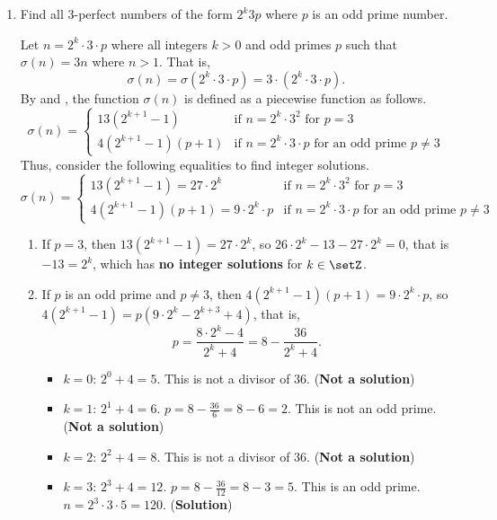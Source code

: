 \begin{enumerate}
\begin{enumerate}
    \newpage
    \item Find all $3$-perfect numbers of the form $2^k 3 p$ where $p$ is an odd prime number.
    \begin{subanswer}
      Let $n = 2^k \cdot 3 \cdot p$ where all integers $k>0$ and odd primes $p$ such that 
      $\sigma(n) = 3n$ where $n>1$. That is,
      \[
      \sigma(n) =\sigma(2^k \cdot 3 \cdot p) = 3 \cdot (2^k \cdot 3 \cdot p).
      \]
      By  and , the function \(\sigma(n)\) is defined as a
      piecewise function as follows.
      \[
        \sigma(n) =
        \begin{cases}
          13(2^{k+1}-1) & \text{if } n = 2^k \cdot 3^2 \text{ for } p = 3\\
          4(2^{k+1}-1)(p+1) & \text{if } n = 2^k \cdot 3 \cdot p \text{ for an odd prime } p \ne 3
        \end{cases}
      \]
      Thus, consider the following equalities to find integer solutions.
      \[
        \sigma(n) =
        \begin{cases}
          13(2^{k+1}-1) = 27 \cdot 2^k & \text{if } n = 2^k \cdot 3^2 \text{ for } p = 3\\
          4(2^{k+1}-1)(p+1) = 9 \cdot 2^k \cdot p & \text{if } n = 2^k \cdot 3 \cdot p \text{ for an odd prime } p \ne 3
        \end{cases}
      \]
      \begin{enumerate}
        \item If $p=3$, then $13(2^{k+1}-1) = 27 \cdot 2^k$, so $26\cdot 2^{k}-13 - 27 \cdot 2^k= 0$, 
        that is $-13 = 2^k$, which has \textbf{no integer solutions} for $k \in \setZ$.
        \item If $p$ is an odd prime and $p \neq 3$, then $4(2^{k+1}-1)(p+1) = 9 \cdot 2^k \cdot p$, 
        so $4(2^{k+1}-1) = p(9 \cdot 2^k - 2^{k+3}+4)$, that is, $$p=\frac{8 \cdot 2^k - 4}{2^k + 4}= 8 - \frac{36}{2^k+4}.$$
        \begin{itemize}
          \item $k=0$: $2^0+4=5$. This is not a divisor of 36. (\textbf{Not a solution})
          \item $k=1$: $2^1+4=6$. $p = 8 - \frac{36}{6} = 8-6=2$. This is not an odd prime. (\textbf{Not a solution})
          \item $k=2$: $2^2+4=8$. This is not a divisor of 36. (\textbf{Not a solution})
          \item $k=3$: $2^3+4=12$. $p = 8 - \frac{36}{12} = 8-3=5$. This is an odd prime. $n = 2^3 \cdot 3 \cdot 5 = 120$. (\textbf{Solution})

\end{itemize}
\end{enumerate}
\end{subanswer}
\end{enumerate}
\end{enumerate}
